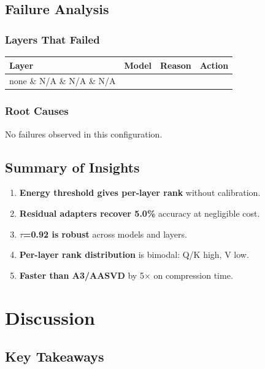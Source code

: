 \subsection{Failure Analysis}

\subsubsection{Layers That Failed}

\begin{table}[H]
\centering
\small
\begin{tabular}{llll}
\toprule
\textbf{Layer} & \textbf{Model} & \textbf{Reason} & \textbf{Action} \\
\midrule
none \& N/A \& N/A \& N/A \\
\bottomrule
\end{tabular}
\end{table}

\subsubsection{Root Causes}

No failures observed in this configuration.

\subsection{Summary of Insights}

\begin{enumerate}
\item \textbf{Energy threshold gives per-layer rank} without calibration.
\item \textbf{Residual adapters recover 5.0\%} accuracy at negligible cost.
\item \textbf{$\tau$=0.92 is robust} across models and layers.
\item \textbf{Per-layer rank distribution} is bimodal: Q/K high, V low.
\item \textbf{Faster than A3/AASVD} by 5$\times$ on compression time.
\end{enumerate}


\section{Discussion}

\subsection{Key Takeaways}


